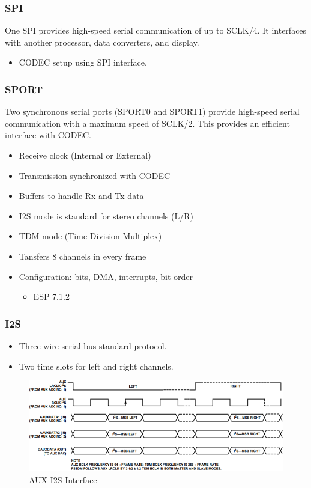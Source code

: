 \subsubsection{SPI}
One SPI provides high-speed serial communication of up to SCLK/4. It
interfaces with another processor, data converters, and display.
\begin{itemize}
	\item CODEC setup using SPI interface.
\end{itemize}

\subsubsection{SPORT}
Two synchronous serial ports (SPORT0 and SPORT1) provide high-speed
serial communication with a maximum speed of SCLK/2. This provides an
efficient interface with CODEC.
\begin{itemize}
	\item Receive clock (Internal or External)
	\item Transmission synchronized with CODEC
	\item Buffers to handle Rx and Tx data
	\item I2S mode is standard for stereo channels (L/R)
	\item TDM mode (Time Division Multiplex)
	\item Tansfers 8 channels in every frame
	\item Configuration: bits, DMA, interrupts, bit order
	\begin{itemize}
		\item ESP 7.1.2
	\end{itemize}
\end{itemize}

\subsubsection{I2S}
\begin{itemize}
	\item Three-wire serial	bus standard protocol.
	\item Two time slots for left and right channels.
\end{itemize}
\begin{figure} [H]
	\centering
	\includegraphics[width=\linewidth]{graphics/21.png}
	\caption{AUX I2S Interface}
	\label{fig:21}
\end{figure}

